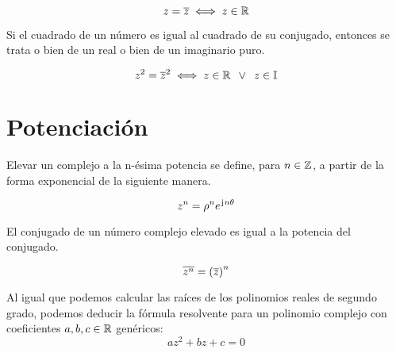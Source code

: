 \begin{mdframed}[style=PropertyFrame]
    \begin{prop}
    \end{prop}
    \begin{equation*}
        z = \overline{z} \iff z \in \mathbb{R}
    \end{equation*}
\end{mdframed}

Si el cuadrado de un número es igual al cuadrado de su conjugado, entonces se trata o bien de un real o bien de un imaginario puro.

\begin{mdframed}[style=PropertyFrame]
    \begin{prop}
    \end{prop}
    \begin{equation*}
        z^2=\overline{z}^2 \iff z \in \mathbb{R} \enspace \lor \enspace z \in \mathbb{I}
    \end{equation*}
\end{mdframed}


\section{Potenciación}

Elevar un complejo a la n-ésima potencia se define, para $n \in \mathbb{Z}$, a partir de la forma exponencial de la siguiente manera.

\begin{mdframed}[style=DefinitionFrame]
    \begin{defn}
        \label{defn:nPower}
    \end{defn}
    \begin{equation*}
        z^n = \rho^n e^{\mkern2mu\mathrm{j}\mkern1mu n \theta}
    \end{equation*}
\end{mdframed}

El conjugado de un número complejo elevado es igual a la potencia del conjugado.

\begin{mdframed}[style=PropertyFrame]
    \begin{prop}
    \end{prop}
    \begin{equation*}
        \overline{z^n} = \left( \overline{z} \right)^n
    \end{equation*}
\end{mdframed}

Al igual que podemos calcular las raíces de los polinomios reales de segundo grado, podemos deducir la fórmula resolvente para un polinomio complejo con coeficientes $a,b,c \in \mathbb{R}$ genéricos:
\begin{equation*}
    az^2 + bz + c = 0
\end{equation*}

